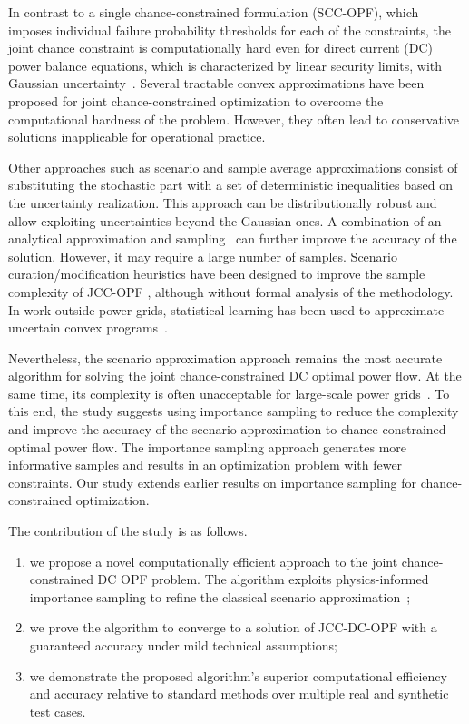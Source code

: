 In contrast to a single chance-constrained formulation (SCC-OPF), which imposes individual failure probability thresholds for each of the constraints, the joint chance constraint is computationally hard even for direct current (DC) power balance equations, which is characterized by linear security limits, with Gaussian uncertainty~\cite{cousins2014cubic,khachiyan1993complexity}. Several tractable convex approximations have been proposed \cite{nemirovski2007convex, nemirovski2006scenario,nemirovski2003tractable,trofino1999bi} for joint chance-constrained optimization to overcome the computational hardness of the problem. However, they often lead to conservative solutions inapplicable for operational practice. 

Other approaches such as scenario and sample average approximations \cite{calafiore2006scenario,garatti2019risk, vrakopoulou2013probabilistic,nemirovski2006scenario} consist of substituting the stochastic part with a set of deterministic inequalities based on the uncertainty realization. This approach can be distributionally robust and allow exploiting uncertainties beyond the Gaussian ones. A combination of an analytical approximation and sampling~\cite{hou2020chance} can further improve the accuracy of the solution. However, it may require a large number of samples. Scenario curation/modification heuristics have been designed to improve the sample complexity of JCC-OPF \cite{mezghani2020stochastic}, although without formal analysis of the methodology. In work outside power grids, statistical learning has been used to approximate uncertain convex programs~\cite{vapnik1999overview,maximov2016tight,campi2020scenario}.

Nevertheless, the scenario approximation approach remains the most accurate algorithm for solving the joint chance-constrained DC optimal power flow. At the same time, its complexity is often unacceptable for large-scale power grids~\cite{sakhavand2020new}. To this end, the study suggests using importance sampling to reduce the complexity and improve the accuracy of the scenario approximation to chance-constrained optimal power flow. The importance sampling approach generates more informative samples and results in an optimization problem with fewer constraints. Our study extends earlier results \cite{barrera2016chance,tong2022optimization} on importance sampling for chance-constrained optimization. 

The contribution of the study is as follows. 
\begin{enumerate}
  \item we propose a novel computationally efficient 
  approach to the joint chance-constrained DC OPF problem. The algorithm exploits physics-informed importance sampling to refine the classical scenario approximation~\cite{calafiore2006scenario};
  \item we prove the algorithm to converge to a solution of JCC-DC-OPF with a guaranteed accuracy under mild technical assumptions; 
  \item we demonstrate the proposed algorithm's superior computational efficiency and accuracy relative to standard methods over multiple real and synthetic test cases.
\end{enumerate}

